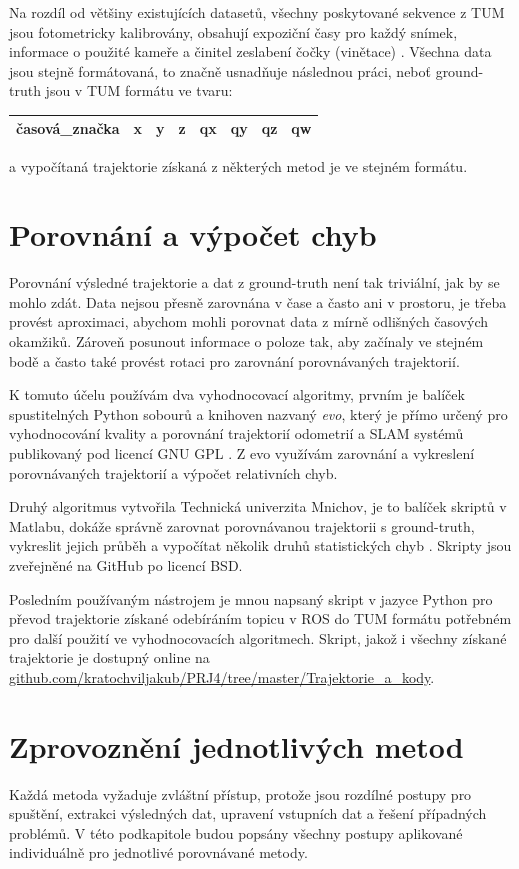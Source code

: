 \documentclass[12pt,a4paper]{report}
\begin{document}
Na rozdíl od většiny existujících datasetů, všechny poskytované sekvence z TUM jsou fotometricky kalibrovány, obsahují expoziční časy pro každý snímek, informace o použité kameře a činitel zeslabení čočky (vinětace) \cite{TUM_datasets}. Všechna data jsou stejně formátovaná, to značně usnadňuje následnou práci, neboť ground-truth jsou v TUM formátu ve tvaru:

\begin{center}
\begin{tabular}{|l|l|l|l|l|l|l|l|}
\hline
časová\_značka & x & y & z & qx & qy & qz & qw \\
\hline
\end{tabular}
\end{center}
a vypočítaná trajektorie získaná z některých metod je ve stejném formátu.

\section{Porovnání a výpočet chyb}
Porovnání výsledné trajektorie a dat z ground-truth není tak triviální, jak by se mohlo zdát. Data nejsou přesně zarovnána v čase a často ani v prostoru, je třeba provést aproximaci, abychom mohli porovnat data z mírně odlišných časových okamžiků. Zároveň posunout informace o poloze tak, aby začínaly ve stejném bodě a často také provést rotaci pro zarovnání porovnávaných trajektorií.

K tomuto účelu používám dva vyhodnocovací algoritmy, prvním je balíček spustitelných Python sobourů a knihoven nazvaný \textit{evo}, který je přímo určený pro vyhodnocování kvality a porovnání trajektorií odometrií a SLAM systémů publikovaný pod licencí GNU GPL \cite{evo}. Z evo využívám zarovnání a vykreslení porovnávaných trajektorií a výpočet relativních chyb.

Druhý algoritmus vytvořila Technická univerzita Mnichov, je to balíček skriptů v Matlabu, dokáže správně zarovnat porovnávanou trajektorii s ground-truth, vykreslit jejich průběh a vypočítat několik druhů statistických chyb \cite{tum_evo}. Skripty jsou zveřejněné na GitHub po licencí BSD.

Posledním používaným nástrojem je mnou napsaný skript v jazyce Python pro převod trajektorie získané odebíráním topicu v ROS do TUM formátu potřebném pro další použití ve vyhodnocovacích algoritmech. Skript, jakož i všechny získané trajektorie je dostupný online na \url{github.com/kratochviljakub/PRJ4/tree/master/Trajektorie_a_kody}.

\section{Zprovoznění jednotlivých metod}
Každá metoda vyžaduje zvláštní přístup, protože jsou rozdílné postupy pro spuštění, extrakci výsledných dat, upravení vstupních dat a řešení případných problémů. V této podkapitole budou popsány všechny postupy aplikované individuálně pro jednotlivé porovnávané metody.
\end{document}

